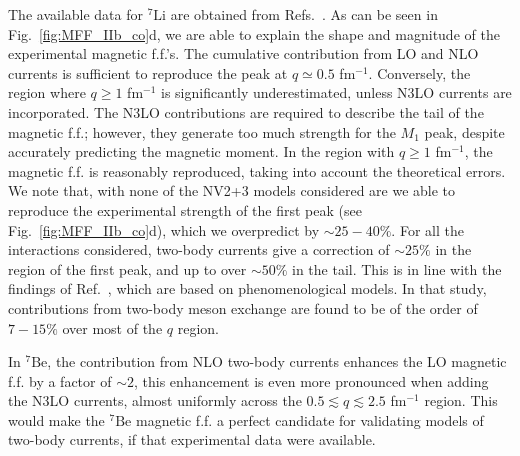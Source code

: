\documentclass[aps,prc,floatfix,showpacs,twocolumn, preprintnumbers]{revtex4-2}
\newcommand{\lisev}{{}^7\text{Li}}
\newcommand{\besev}{{}^7\text{Be}}
\begin{document}
The available data for $\lisev$ are obtained from Refs.~\cite{Peterson1962,Goldemberg1963,Vanniftrik1971, Lichtenstadt1983}. As can be seen in Fig.~\ref{fig:MFF_IIb_co}d, we are able to explain the shape and magnitude of the experimental magnetic f.f.'s.
The cumulative contribution from LO and NLO currents is sufficient to reproduce the peak at $q\simeq0.5$ fm$^{-1}$. 
Conversely, the region where $q\geq 1$ fm$^{-1}$ is significantly underestimated, unless N3LO currents are incorporated. The N3LO contributions are required to describe the tail of the magnetic f.f.; however, they generate too much strength for the $M_1$ peak, despite accurately predicting the magnetic moment. In the region with $q\geq 1$ fm$^{-1}$, the magnetic f.f. is reasonably reproduced, taking into account the theoretical errors. We note that, with none of the NV2+3 models considered are we able to reproduce the experimental strength of the first peak (see Fig.~\ref{fig:MFF_IIb_co}d), which we overpredict by ${\sim} 25-40\%$. For all the interactions considered, two-body currents give a correction of ${\sim} 25\%$ in the region of the first peak, and up to over ${\sim} 50\%$ in the tail. This is in line with the findings of Ref.~\cite{Donnelly1984}, which are based on phenomenological models. In that study, contributions from two-body meson exchange are found to be of the order of $7-15\%$ over most of the $q$ region. 

In $\besev$, the contribution from NLO two-body currents enhances the LO magnetic f.f. by a factor of ${\sim} 2$, this enhancement is even more pronounced when adding the N3LO currents, almost uniformly across the $0.5\lesssim q\lesssim 2.5$ fm$^{-1}$ region. This would make the $\besev$ magnetic f.f. a perfect candidate for validating models of two-body currents, if that experimental data were available. 
\end{document}
